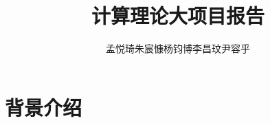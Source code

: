\documentclass[UTF8]{ctexart}
\title{计算理论大项目报告}
\author{孟悦琦\quad 朱宸慷\quad 杨钧博\quad 李昌玟\quad 尹容乎}
\begin{document}
\maketitle

\section{背景介绍}
\end{document}
